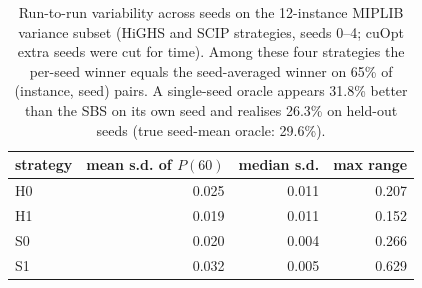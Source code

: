 \begin{table}[t]\centering\small
\begin{tabular}{lrrr}
\toprule
strategy & mean s.d. of $P(60)$ & median s.d. & max range \\
\midrule
H0 & 0.025 & 0.011 & 0.207 \\
H1 & 0.019 & 0.011 & 0.152 \\
S0 & 0.020 & 0.004 & 0.266 \\
S1 & 0.032 & 0.005 & 0.629 \\
\bottomrule
\end{tabular}
\caption{Run-to-run variability across seeds on the 12-instance MIPLIB variance subset (HiGHS and SCIP strategies, seeds 0--4; cuOpt extra seeds were cut for time). Among these four strategies the per-seed winner equals the seed-averaged winner on 65\% of (instance, seed) pairs. A single-seed oracle appears 31.8\% better than the SBS on its own seed and realises 26.3\% on held-out seeds (true seed-mean oracle: 29.6\%).}\label{tab:variance}
\end{table}